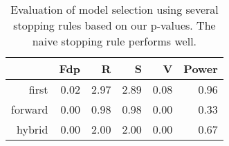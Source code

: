 \begin{table}[ht]
\centering
\begin{tabular}{rrrrrr}
  \hline
 & Fdp & R & S & V & Power \\ 
  \hline
first & 0.02 & 2.97 & 2.89 & 0.08 & 0.96 \\ 
  forward & 0.00 & 0.98 & 0.98 & 0.00 & 0.33 \\ 
  hybrid & 0.00 & 2.00 & 2.00 & 0.00 & 0.67 \\ 
   \hline
\end{tabular}
\caption{Evaluation of model selection using several stopping rules based on our p-values. The naive stopping rule performs well.} 
\end{table}

